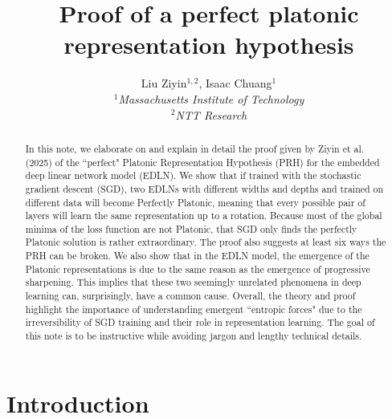 \documentclass[11pt]{article}
\theoremstyle{plain}
\begin{document}

\title{Proof of a perfect platonic representation hypothesis}
\author{Liu Ziyin$^{1,2}$, Isaac Chuang$^{1}$\\
$^1$\textit{Massachusetts Institute of Technology}\\
$^2$\textit{NTT Research}}
\maketitle

\begin{abstract}
    In this note, we elaborate on and explain in detail the proof given by Ziyin et al. (2025) of the ``perfect" Platonic Representation Hypothesis (PRH) for the embedded deep linear network model (EDLN). We show that if trained with the stochastic gradient descent (SGD), two EDLNs with different widths and depths and trained on different data will become Perfectly Platonic, meaning that every possible pair of layers will learn the same representation up to a rotation. Because most of the global minima of the loss function are not Platonic, that SGD only finds the perfectly Platonic solution is rather extraordinary. The proof also suggests at least six ways the PRH can be broken. We also show that in the EDLN model, the emergence of the Platonic representations is due to the same reason as the emergence of progressive sharpening. This implies that these two seemingly unrelated phenomena in deep learning can, surprisingly, have a common cause. Overall, the theory and proof highlight the importance of understanding emergent ``entropic forces" due to the irreversibility of SGD training and their role in representation learning. The goal of this note is to be instructive while avoiding jargon and lengthy technical details.
\end{abstract}

\tableofcontents

\section{Introduction}
\end{document}
